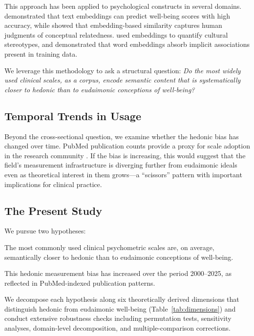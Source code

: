 \documentclass[12pt,a4paper]{article}
\begin{document}
This approach has been applied to psychological constructs in several domains.
\citet{kjell2023text} demonstrated that text embeddings can predict well-being scores with high accuracy, while
\citet{bhatia2019predicting} showed that embedding-based similarity captures human judgments of conceptual relatedness.
\citet{grand2022semantic} used embeddings to quantify cultural stereotypes, and
\citet{caliskan2017semantics} demonstrated that word embeddings absorb implicit associations present in training data.

We leverage this methodology to ask a structural question: \textit{Do the most widely used clinical scales, as a corpus, encode semantic content that is systematically closer to hedonic than to eudaimonic conceptions of well-being?}

\subsection{Temporal Trends in Usage}

Beyond the cross-sectional question, we examine whether the hedonic bias has changed over time.
PubMed publication counts provide a proxy for scale adoption in the research community
\citep{larsen2010rate, bornmann2015growth}.
If the bias is increasing, this would suggest that the field's measurement infrastructure is diverging further from eudaimonic ideals even as theoretical interest in them grows---a ``scissors'' pattern with important implications for clinical practice.

\subsection{The Present Study}

We pursue two hypotheses:
\begin{description}[style=nextline]
    \item[H1:] The most commonly used clinical psychometric scales are, on average, semantically closer to hedonic than to eudaimonic conceptions of well-being.
    \item[H2:] This hedonic measurement bias has increased over the period 2000--2025, as reflected in PubMed-indexed publication patterns.
\end{description}

We decompose each hypothesis along six theoretically derived dimensions that distinguish hedonic from eudaimonic well-being (Table~\ref{tab:dimensions}) and conduct extensive robustness checks including permutation tests, sensitivity analyses, domain-level decomposition, and multiple-comparison corrections.
\end{document}

